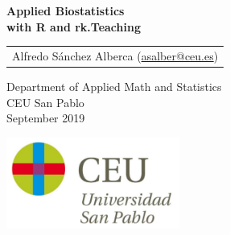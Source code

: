 \begin{titlepage}
\thispagestyle{empty}
\vspace*{7cm}
\par

\begin{center}
\normalfont\fontsize{30}{30}\selectfont
{\bfseries \color{blueceu}Applied Biostatistics\\ with R and rk.Teaching}
\end{center}
\vspace{1cm}

\begin{center}
\Large
\begin{tabular}{c}
Alfredo Sánchez Alberca (\url{asalber@ceu.es})\\
\end{tabular}

\medskip 
Department of Applied Math and Statistics\\ CEU San Pablo\\[1cm]
\medskip 
September 2019

\vspace{1cm}
\includegraphics[height=3cm]{img/logo_uspceu}
\end{center}
\vfill
\end{titlepage}